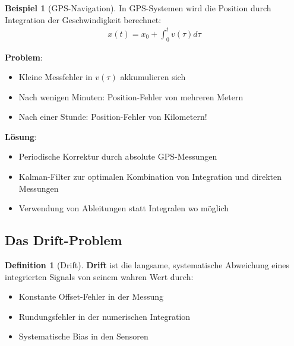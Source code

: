 ﻿\documentclass[a4paper,12pt]{report}
\theoremstyle{definition}
\newtheorem{definition}{Definition}
\newtheorem{beispiel}{Beispiel}
\begin{document}
	\begin{beispiel}[GPS-Navigation]
		In GPS-Systemen wird die Position durch Integration der Geschwindigkeit berechnet:
		\begin{align}
			x(t) = x_0 + \int_0^t v(\tau) d\tau
		\end{align}
		
		\textbf{Problem}: 
		\begin{itemize}
			\item[-] Kleine Messfehler in $v(\tau)$ akkumulieren sich
			\item[-] Nach wenigen Minuten: Position-Fehler von mehreren Metern
			\item[-] Nach einer Stunde: Position-Fehler von Kilometern!
		\end{itemize}
		
		\textbf{Lösung}:
		\begin{itemize}
			\item[-] Periodische Korrektur durch absolute GPS-Messungen
			\item[-] Kalman-Filter zur optimalen Kombination von Integration und direkten Messungen
			\item[-] Verwendung von Ableitungen statt Integralen wo möglich
		\end{itemize}
	\end{beispiel}
	
	\subsection{Das Drift-Problem}
	
	\begin{definition}[Drift]
		\textbf{Drift} ist die langsame, systematische Abweichung eines integrierten Signals von seinem wahren Wert durch:
		\begin{itemize}
			\item[-] Konstante Offset-Fehler in der Messung
			\item[-] Rundungsfehler in der numerischen Integration
			\item[-] Systematische Bias in den Sensoren
		\end{itemize}
	\end{definition}
	
\end{document}
